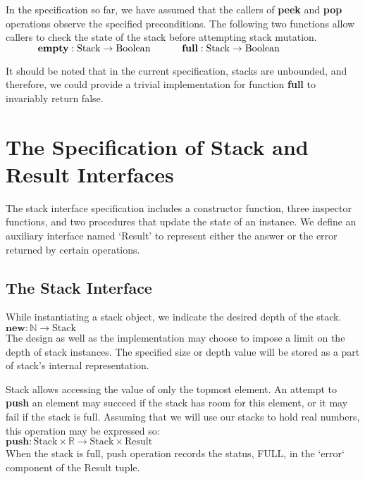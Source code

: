 \documentclass[10pt]{article}
\begin{document}
In the specification so far, we have assumed that the callers of {\textbf{peek}} and {\textbf{pop}} operations observe the specified preconditions. The following two functions allow callers to check the state of the stack before attempting stack mutation.
\vspace*{6pt}\\\(
\hspace*{32pt}\textbf{empty}: \mathrm{Stack} \rightarrow \mathrm{Boolean}\vspace*{4pt}\\
\hspace*{32pt}\textbf{full}: \mathrm{Stack} \rightarrow \mathrm{Boolean}
\)\vspace*{6pt}

It should be noted that in the current specification, stacks are unbounded, and therefore, we could provide a trivial implementation for function {\textbf{full}} to invariably return false.

\section{The Specification of Stack and Result Interfaces}
  \noindent The stack interface specification includes a constructor function, three inspector functions, and two procedures that update the state of an instance. We define an auxiliary interface named `Result' to represent either the answer or the error returned by certain operations.   
  
  \subsection{The Stack Interface}
  \noindent While instantiating a stack object, we indicate the desired depth of the stack. 
  \vspace*{6pt}\\\hspace*{32pt}\(
  \textbf{new}: \mathbb{N} \rightarrow \mathrm{Stack}
  \)\vspace*{6pt}\\
  The design as well as the implementation may choose to impose a limit on the depth of stack instances. The specified size or depth value will be stored as a part of stack's internal representation.  

  Stack allows accessing the value of only the topmost element. An attempt to \textbf{push} an element may succeed if the stack has room for this element, or it may fail if the stack is full. Assuming that we will use our stacks to hold real numbers, this operation may be expressed so:
  \vspace*{6pt}\\\hspace*{32pt}\(
  \textbf{push}: \mathrm{Stack} \times \mathbb{R} \rightarrow \mathrm{Stack \times Result}
  \)\vspace*{6pt}\\
  When the stack is full, push operation records the status, FULL, in the `error` component of the Result tuple.
\end{document}
